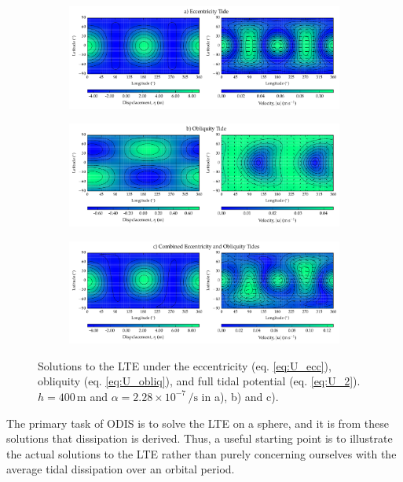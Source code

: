 \begin{figure}[!t]
\begin{subfigure}{\linewidth}
\centering
\includegraphics[width=0.8\linewidth,trim={0 0 0 0.2cm},clip]{Figures/Ecc_test}
\subcaption{\label{fig:LTE_a}}
\end{subfigure}\vspace*{-0.7cm}
\begin{subfigure}{\linewidth}
\centering
\includegraphics[width=0.8\linewidth]{Figures/Obliq_test}
\subcaption{\label{fig:LTE_b}}
\end{subfigure}\vspace*{-0.7cm}
\begin{subfigure}{\linewidth}
\centering
\includegraphics[width=0.8\linewidth]{Figures/Full_test}
\subcaption{\label{fig:LTE_c}}
\end{subfigure}\vspace*{-0.8cm}
\caption{Solutions to the LTE under the eccentricity (eq. \ref{eq:U_ecc}), obliquity (eq. \ref{eq:U_obliq}), and full tidal potential (eq. \ref{eq:U_2}). $h = 400 \, \si{\metre}$ and $\alpha = 2.28 \times 10^{-7} \, \si{\per\second}$ in a), b) and c).\label{fig:LTE_solns}}
\end{figure}

The primary task of ODIS is to solve the LTE on a sphere, and it is from these solutions that dissipation is derived. Thus, a useful starting point is to illustrate the actual solutions to the LTE rather than purely concerning ourselves with the average tidal dissipation over an orbital period. 

